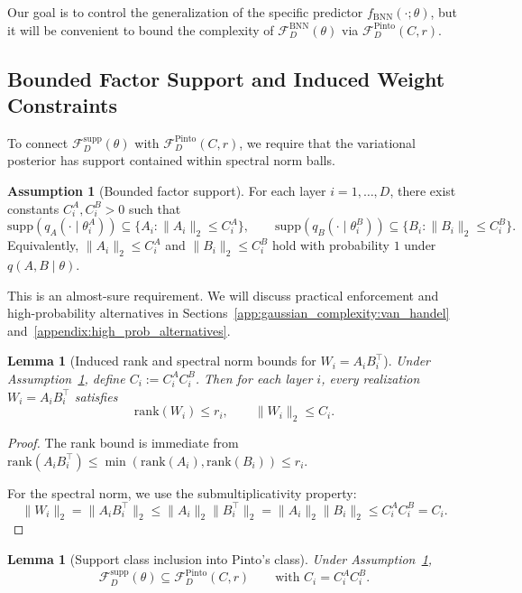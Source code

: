 \documentclass{article}
\theoremstyle{plain}
\newtheorem{lemma}[theorem]{Lemma}
\theoremstyle{definition}
\newtheorem{assumption}[theorem]{Assumption}
\theoremstyle{remark}
\begin{document}
Our goal is to control the generalization of the specific predictor $f_{\mathrm{BNN}}(\cdot;\theta)$, but it will be convenient to bound the complexity of $\mathcal{F}^{\mathrm{BNN}}_D(\theta)$ via $\mathcal{F}^{\mathrm{Pinto}}_D(C,r)$.

\subsection{Bounded Factor Support and Induced Weight Constraints}\label{app:gaussian_complexity:bounded_support}

To connect $\mathcal{F}^{\mathrm{supp}}_D(\theta)$ with $\mathcal{F}^{\mathrm{Pinto}}_D(C,r)$, we require that the variational posterior has support contained within spectral norm balls.

\begin{assumption}[Bounded factor support]
\label{ass:bounded_factor_support}
For each layer $i=1,\ldots,D$, there exist constants $C_i^A,C_i^B>0$ such that
\[
\mathrm{supp}(q_A(\cdot\mid\theta_i^A)) \subseteq \{A_i:\|A_i\|_2\le C_i^A\},
\qquad
\mathrm{supp}(q_B(\cdot\mid\theta_i^B)) \subseteq \{B_i:\|B_i\|_2\le C_i^B\}.
\]
Equivalently, $\|A_i\|_2\le C_i^A$ and $\|B_i\|_2\le C_i^B$ hold with probability $1$ under $q(A,B\mid\theta)$.
\end{assumption}

This is an almost-sure requirement. We will discuss practical enforcement and high-probability alternatives in Sections~\ref{app:gaussian_complexity:van_handel} and~\ref{appendix:high_prob_alternatives}.

\begin{lemma}[Induced rank and spectral norm bounds for $W_i=A_iB_i^\top$]
\label{lem:induced_constraints}
Under Assumption~\ref{ass:bounded_factor_support}, define $C_i:=C_i^A C_i^B$. Then for each layer $i$, every realization $W_i=A_iB_i^\top$ satisfies
\[
\mathrm{rank}(W_i)\le r_i,
\qquad
\|W_i\|_2 \le C_i.
\]
\end{lemma}

\begin{proof}
The rank bound is immediate from $\mathrm{rank}(A_iB_i^\top)\le \min(\mathrm{rank}(A_i),\mathrm{rank}(B_i))\le r_i$.

For the spectral norm, we use the submultiplicativity property:
\[
\|W_i\|_2=\|A_iB_i^\top\|_2 \le \|A_i\|_2\|B_i^\top\|_2=\|A_i\|_2\|B_i\|_2\le C_i^AC_i^B=C_i.
\]
\end{proof}

\begin{lemma}[Support class inclusion into Pinto's class]
\label{lem:supp_subset_pinto}
Under Assumption~\ref{ass:bounded_factor_support},
\[
\mathcal{F}^{\mathrm{supp}}_D(\theta) \subseteq \mathcal{F}^{\mathrm{Pinto}}_D(C,r)
\qquad
\text{with }C_i=C_i^AC_i^B.
\]
\end{lemma}
\end{document}
